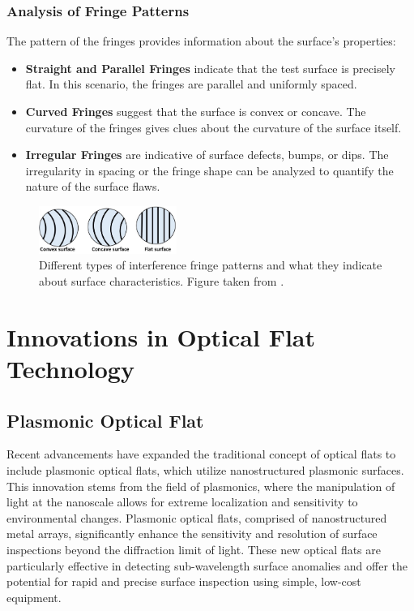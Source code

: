 \documentclass[../main.tex]{subfiles}
\begin{document}
\subsubsection{Analysis of Fringe Patterns}
\vspace{-8pt}
The pattern of the fringes provides information about the surface's properties:
\vspace{-4pt}
\begin{itemize}
    \setlength{\itemsep}{0.1mm}
    \item \textbf{Straight and Parallel Fringes} indicate that the test surface is precisely flat. In this scenario, the fringes are parallel and uniformly spaced.
    \item \textbf{Curved Fringes} suggest that the surface is convex or concave. The curvature of the fringes gives clues about the curvature of the surface itself.
    \item \textbf{Irregular Fringes} are indicative of surface defects, bumps, or dips. The irregularity in spacing or the fringe shape can be analyzed to quantify the nature of the surface flaws.
\end{itemize}

\begin{figure}[H]
    \centering
    \includegraphics[width=0.4\textwidth]{Images/Introduction/fringe_types2}
    \vspace{-8pt}
    \caption{Different types of interference fringe patterns and what they indicate about surface characteristics. Figure taken from \cite{Joji_2023}.}
    \label{fig:fringe-types}
\end{figure}

\section{Innovations in Optical Flat Technology}
\vspace{-15pt}
\subsection{Plasmonic Optical Flat}
\vspace{-15pt}
Recent advancements have expanded the traditional concept of optical flats to include plasmonic optical flats, which utilize nanostructured plasmonic surfaces. This innovation stems from the field of plasmonics, where the manipulation of light at the nanoscale allows for extreme localization and sensitivity to environmental changes. Plasmonic optical flats, comprised of nanostructured metal arrays, significantly enhance the sensitivity and resolution of surface inspections beyond the diffraction limit of light. These new optical flats are particularly effective in detecting sub-wavelength surface anomalies and offer the potential for rapid and precise surface inspection using simple, low-cost equipment. \cite{WOS:000387461800007}
\vspace{-15pt}
\end{document}
